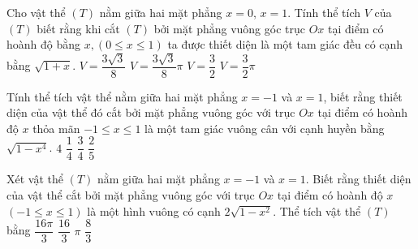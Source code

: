 \begin{ex}
	Cho vật thể $(T)$ nằm giữa hai mặt phẳng $x=0$, $x=1$. Tính thể tích $V$ của $(T)$ biết rằng khi cắt $(T)$ bởi mặt phẳng vuông góc trục $Ox$ tại điểm có hoành độ bằng $x, (0\leq x\leq 1)$ ta được thiết diện là một tam giác đều có cạnh bằng $\sqrt{1+x}$.
	\choice
	{\True $V=\dfrac{3\sqrt{3}}{8}$}
	{$V=\dfrac{3\sqrt{3}}{8}\pi$}
	{$V=\dfrac{3}{2}$}
	{$V=\dfrac{3}{2}\pi$}
\end{ex}

\begin{ex}%
	Tính thể tích vật thể nằm giữa hai mặt phẳng $x=-1$ và $x=1$, biết rằng thiết diện của vật thể đó cắt bởi mặt phẳng vuông góc với trục $Ox$ tại điểm có hoành độ $x$ thỏa mãn $-1\le x\le 1$ là một tam giác vuông cân với cạnh huyền bằng $\sqrt{1-x^4}$.
	\choice
	{$4$}
	{$\dfrac{1}{4}$}
	{$\dfrac{3}{4}$}
	{\True $\dfrac{2}{5}$}
\end{ex}
\begin{ex}%
	Xét vật thể $(T)$ nằm giữa hai mặt phẳng $x=-1$ và $x=1$. Biết rằng thiết diện của vật thể cắt bởi mặt phẳng vuông góc với trục $Ox$ tại điểm có hoành độ $x$ $(-1\leq x\leq 1)$ là một hình vuông có cạnh $2\sqrt{1-x^2}$. Thể tích vật thể $(T)$ bằng
	\choice
	{$\dfrac{16\pi}{3}$}
	{\True $\dfrac{16}{3}$}
	{$\pi$}
	{$\dfrac{8}{3}$}
\end{ex}

